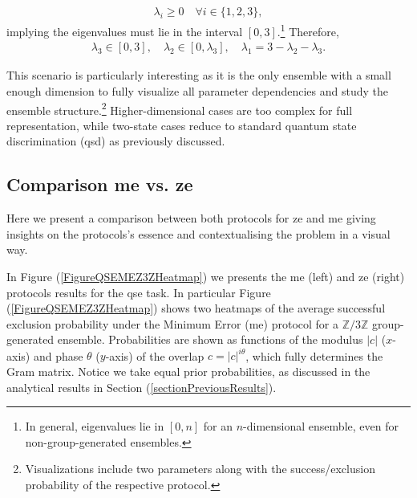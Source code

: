 \documentclass[12pt,letterpaper]{article}
\begin{document}
\begin{align*}
	\lambda_i \geq 0 \quad \forall i \in \{1,2,3\},
\end{align*}
implying the eigenvalues must lie in the interval $[0,3]$.\footnote{In general, eigenvalues lie in $[0,n]$ for an $n$-dimensional ensemble, even for non-group-generated ensembles.} Therefore,
\begin{align*}
	\lambda_3 \in [0,3], \quad \lambda_2 \in [0,\lambda_3], \quad \lambda_1 = 3 - \lambda_2 - \lambda_3.
\end{align*}

This scenario is particularly interesting as it is the only ensemble with a small enough dimension to fully visualize all parameter dependencies and study the ensemble structure.\footnote{Visualizations include two parameters along with the success/exclusion probability of the respective protocol.} Higher-dimensional cases are too complex for full representation, while two-state cases reduce to standard quantum state discrimination (\gls{qsd}) as previously discussed.

\subsection{Comparison \gls{me} vs. \gls{ze}}

\hspace{20pt}Here we present a comparison between both protocols for \gls{ze} and \gls{me} giving insights on the protocols's essence and contextualising the problem in a visual way.

In Figure (\ref{FigureQSEMEZ3ZHeatmap})  we presents the \gls{me} (left) and \gls{ze} (right) protocols results for the \gls{qse} task. In particular Figure (\ref{FigureQSEMEZ3ZHeatmap}) shows two heatmaps of the average successful exclusion probability under the Minimum Error (\gls{me}) protocol for a $\mathbb{Z}/3\mathbb{Z}$ group-generated ensemble. Probabilities are shown as functions of the modulus $|c|$ ($x$-axis) and phase $\theta$ ($y$-axis) of the overlap $c=|c|^{i\theta}$, which fully determines the Gram matrix. Notice we take equal prior probabilities, as discussed in the analytical results in Section (\ref{sectionPreviousResults}). 
\end{document}
